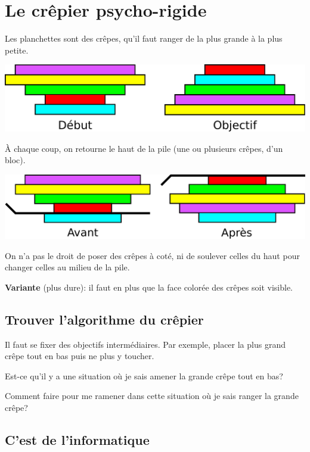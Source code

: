 \documentclass[a7paper,pagesize,DIV=14,10pt]{scrbook}
\begin{document}
\section*{Le crêpier psycho-rigide}

\vspace{-.5\baselineskip}
Les planchettes sont des crêpes, qu'il faut ranger de la plus grande à
la plus petite.

\smallskip
\includegraphics[width=\linewidth]{img/crepes_but-du-jeu.pdf}

À chaque coup, on retourne le haut de la pile (une ou plusieurs crêpes,
d'un bloc).

\smallskip
\includegraphics[width=\linewidth]{img/crepes_un-coup.pdf}

\medskip%
On n'a pas le droit de poser des crêpes à coté, ni de soulever celles
du haut pour changer celles au milieu de la pile.

\bigskip%
\textbf{Variante} (plus dure): il faut en plus que la face colorée des
crêpes soit visible.

\newpage
\subsection*{Trouver l'algorithme du crêpier}
\vspace{-.5\baselineskip}

Il faut se fixer des objectifs intermédiaires. Par exemple, placer la
plus grand crêpe tout en bas puis ne plus y toucher.

\smallskip
Est-ce qu'il y a une situation où je sais amener la grande crêpe tout en bas?

\smallskip
Comment faire pour me ramener dans cette situation où je sais ranger la grande crêpe?

\subsection*{C'est de l'informatique}
\vspace{-.5\baselineskip}
\end{document}
